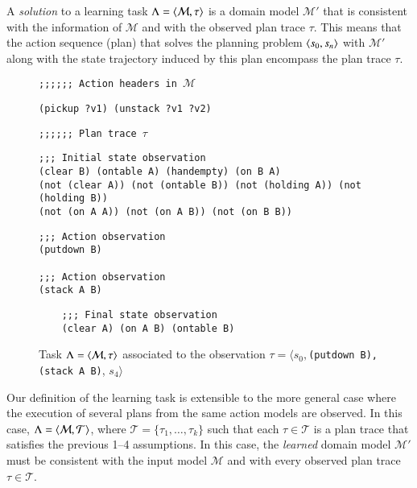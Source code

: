 A {\em solution} to a learning task $\Lambda={\langle \mathcal{M},\tau \rangle}$ is a domain model $\mathcal{M}'$ that is consistent with the information of $\mathcal{M}$ and with the observed plan trace $\tau$. This means that the action sequence (plan) that solves the planning problem ${\langle s_0,s_n \rangle}$ with $\mathcal{M}'$ along with the state trajectory induced by this plan encompass the plan trace $\tau$.

\begin{figure}[hbt!]
{\footnotesize\tt ;;;;;; Action headers in $\mathcal{M}$}
\begin{footnotesize}
\begin{verbatim}
(pickup ?v1) (unstack ?v1 ?v2)
\end{verbatim}
\end{footnotesize}
\vspace{0.2cm}
{\footnotesize\tt ;;;;;; Plan trace $\tau$}
\begin{footnotesize}
\begin{verbatim}
;;; Initial state observation
(clear B) (ontable A) (handempty) (on B A)
(not (clear A)) (not (ontable B)) (not (holding A)) (not (holding B))
(not (on A A)) (not (on A B)) (not (on B B))
\end{verbatim}
\end{footnotesize}

\begin{footnotesize}
\begin{verbatim}
;;; Action observation
(putdown B)

;;; Action observation
(stack A B)
\end{verbatim}
\end{footnotesize}

\begin{footnotesize}
	\begin{verbatim}
	;;; Final state observation
	(clear A) (on A B) (ontable B)
	\end{verbatim}
\end{footnotesize}

 \caption{\small Task $\Lambda={\langle \mathcal{M},\tau \rangle}$ associated to the observation $\tau=\langle s_0,${\small\tt (putdown\ B),(stack\ A\ B)}, $s_4\rangle$}
\label{fig:example-plans}
\end{figure}

Our definition of the learning task is extensible to the more general case where the execution of several plans from the same action models are observed. In this case, $\Lambda={\langle \mathcal{M},\mathcal{T} \rangle}$, where $\mathcal{T}=\{\tau_1,\ldots,\tau_{k}\}$ such that each $\tau\in \mathcal{T}$ is a plan trace that satisfies the previous 1--4 assumptions. In this case, the {\em learned} domain model $\mathcal{M}'$ must be consistent with the input model $\mathcal{M}$ and with every observed plan trace $\tau\in \mathcal{T}$.


